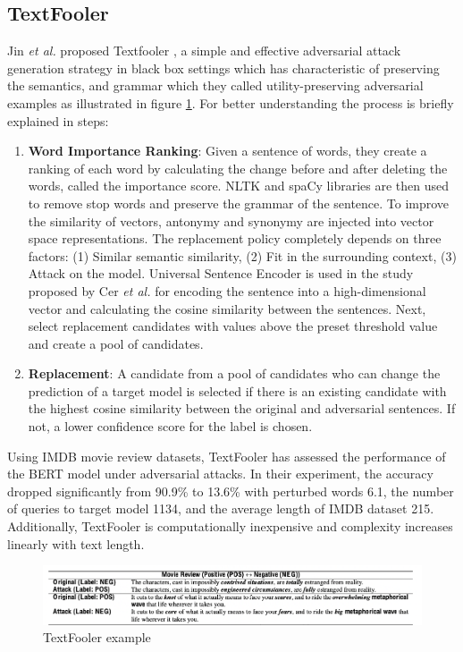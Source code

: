 \documentclass[%
	BCOR=8mm, %
	DIV=12,
	toc=bibliography, %
	toc=listof, %
	oneside, %
	egregdoesnotlikesansseriftitles, %
	]{scrbook}
\begin{document}
\subsection{TextFooler}
\label{subsection:textfooler}
Jin \textit{et al.} proposed Textfooler \cite{jia_certified_2019}, a simple and effective adversarial attack generation strategy in black box settings which has characteristic of preserving the semantics, and grammar which they called utility-preserving adversarial examples as illustrated in figure \ref{diag:TextFoolerExp}. For better understanding the process is briefly explained in steps:
\begin{enumerate}
    \item  \textbf{Word Importance Ranking}: Given a sentence of words, they create a ranking of each word by calculating the change before and after deleting the words, called the importance score. NLTK and spaCy libraries are then used to remove stop words and preserve the grammar of the sentence. To improve the similarity of vectors, antonymy and synonymy are injected into vector space representations.
    The replacement policy completely depends on three factors: (1) Similar semantic similarity, (2) Fit in the surrounding context, (3) Attack on the model. Universal Sentence Encoder is used in the study proposed by Cer \textit{et al.} \cite{cer_universal_2018} for encoding the sentence into a high-dimensional vector and calculating the cosine similarity between the sentences. Next, select replacement candidates with values above the preset threshold value and create a pool of candidates.
    \item \textbf{Replacement}: A candidate from a pool of candidates who can change the prediction of a target model is selected if there is an existing candidate with the highest cosine similarity between the original and adversarial sentences. If not, a lower confidence score for the label is chosen.
\end{enumerate}
Using IMDB movie review datasets, TextFooler has assessed the performance of the BERT model under adversarial attacks. In their experiment, the accuracy dropped significantly from 90.9\% to 13.6\% with perturbed words 6.1, the number of queries to target model 1134, and the average length of IMDB dataset 215. Additionally, TextFooler is computationally inexpensive and complexity increases linearly with text length. 
\begin{figure}[H]
    \centering
    \includegraphics[width=1.0\textwidth]{img/textfooler_example.png}
    \caption[Example of TextFooler]{TextFooler example  \cite{jia_certified_2019} }
    \label{diag:TextFoolerExp}
\end{figure}
\end{document}
